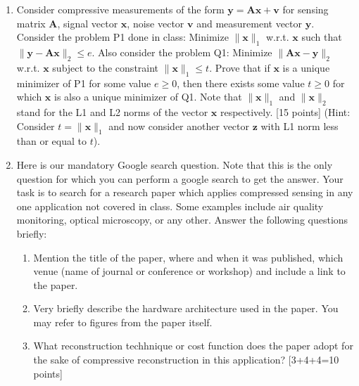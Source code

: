 \documentclass[11pt]{article}
\begin{document}
\begin{enumerate}
\item Consider compressive measurements of the form $\boldsymbol{y} = \boldsymbol{Ax} + \boldsymbol{v}$ for sensing matrix $\boldsymbol{A}$, signal vector $\boldsymbol{x}$, noise vector
$\boldsymbol{v}$ and measurement vector $\boldsymbol{y}$. Consider the problem P1 done in class: Minimize $\|\boldsymbol{x}\|_1$ w.r.t. $\boldsymbol{x}$ such that $\|\boldsymbol{y}-\boldsymbol{Ax}\|_2 \leq e$. Also consider the problem Q1: Minimize $\|\boldsymbol{Ax}-\boldsymbol{y}\|_2$ w.r.t. $\boldsymbol{x}$ subject to the constraint $\|\boldsymbol{x}\|_1 \leq t$. Prove that if $\boldsymbol{x}$ is a unique minimizer of P1 for some value $e \geq 0$, then there exists some value $t \geq 0$ for which $\boldsymbol{x}$ is also a
unique minimizer of Q1. Note that $\|\boldsymbol{x}\|_1$ and $\|\boldsymbol{x}\|_2$ stand for the L1 and L2 norms of the vector $\boldsymbol{x}$ respectively. \textsf{[15
points]} (Hint: Consider $t = \|\boldsymbol{x}\|_1$ and now consider another vector $\boldsymbol{z}$ with L1 norm less than or equal to $t$).

\item Here is our mandatory Google search question. Note that this is the only question for which you can perform a google search to get the answer. Your task is to search for a research paper which applies compressed sensing in any one application not covered in class. Some examples include air quality monitoring, optical microscopy, or any other. Answer the following questions briefly:
\begin{enumerate}
\item Mention the title of the paper, where and when it was published, which venue (name of journal or conference or workshop) and include a link to the paper. 
\item Very briefly describe the hardware architecture used in the paper. You may refer to figures from the paper itself. 
\item What reconstruction techhnique or cost function does the paper adopt for the sake of compressive reconstruction in this application?  \textsf{[3+4+4=10 points]}
\end{enumerate} 


\end{enumerate}
\end{document}

